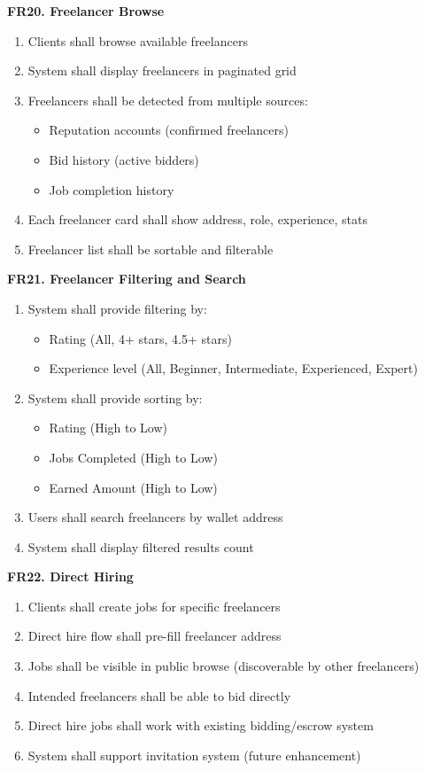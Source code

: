 \documentclass[a4paper,13pt,twoside]{report}
\theoremstyle{definition}
\begin{document}
\textbf{FR20. Freelancer Browse}

\begin{enumerate}
    \item Clients shall browse available freelancers
    \item System shall display freelancers in paginated grid
    \item Freelancers shall be detected from multiple sources:
    \begin{itemize}
        \item Reputation accounts (confirmed freelancers)
        \item Bid history (active bidders)
        \item Job completion history
    \end{itemize}
    \item Each freelancer card shall show address, role, experience, stats
    \item Freelancer list shall be sortable and filterable
\end{enumerate}

\textbf{FR21. Freelancer Filtering and Search}

\begin{enumerate}
    \item System shall provide filtering by:
    \begin{itemize}
        \item Rating (All, 4+ stars, 4.5+ stars)
        \item Experience level (All, Beginner, Intermediate, Experienced, Expert)
    \end{itemize}
    \item System shall provide sorting by:
    \begin{itemize}
        \item Rating (High to Low)
        \item Jobs Completed (High to Low)
        \item Earned Amount (High to Low)
    \end{itemize}
    \item Users shall search freelancers by wallet address
    \item System shall display filtered results count
\end{enumerate}

\textbf{FR22. Direct Hiring}

\begin{enumerate}
    \item Clients shall create jobs for specific freelancers
    \item Direct hire flow shall pre-fill freelancer address
    \item Jobs shall be visible in public browse (discoverable by other freelancers)
    \item Intended freelancers shall be able to bid directly
    \item Direct hire jobs shall work with existing bidding/escrow system
    \item System shall support invitation system (future enhancement)
\end{enumerate}
\end{document}

